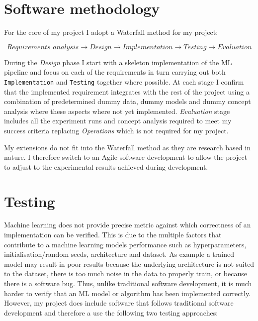 

\section{Software methodology}


For the core of my project I adopt a Waterfall method  for my project:

\begin{equation*}
    \textit{Requirements analysis} \longrightarrow \textit{Design} \longrightarrow \textit{Implementation} \longrightarrow \textit{Testing} \longrightarrow \textit{Evaluation}
\end{equation*}

During the \textit{Design} phase I start with a skeleton implementation of the ML pipeline and focus on each of the requirements in turn carrying out both \texttt{Implementation} and \texttt{Testing} together where possible.
At each stage I confirm that the implemented requirement integrates with the rest of the project using a combination of predetermined dummy data, dummy models and dummy concept analysis where these aspects where not yet implemented.
\textit{Evaluation} stage includes all the experiment runs and concept analysis required to meet my success criteria replacing \textit{Operations} which is not required for my project.

My extensions do not fit into the Waterfall method as they are research based in nature. I therefore switch to an Agile software development  to allow the project to adjust to the experimental results achieved during development.

\section{Testing}


Machine learning does not provide precise metric against which correctness of an implementation can be verified.
This is due to the multiple factors that contribute to a machine learning models performance such as hyperparameters, initialisation/random seeds, architecture and dataset.
As example a trained model may result in poor results because the underlying architecture is not suited to the dataset, there is too much noise in the data to properly train, or because there is a software bug.
Thus, unlike traditional software development, it is much harder to verify that an ML model or algorithm has been implemented correctly.
However, my project does include software that follows traditional software development and therefore a use the following two testing approaches:

